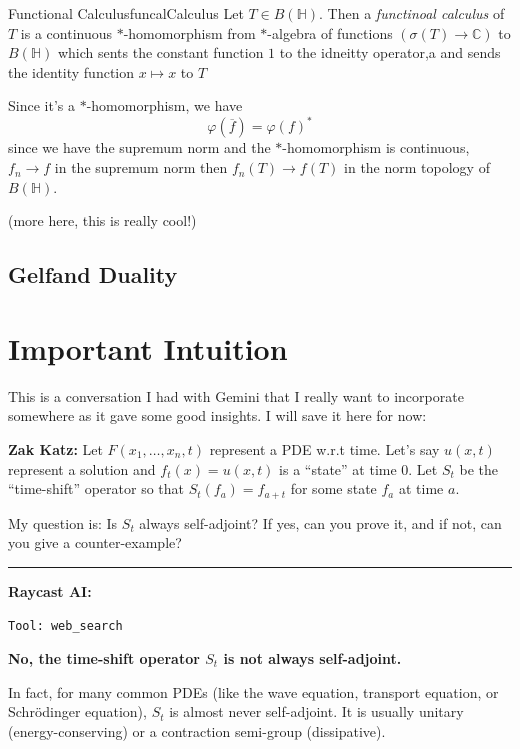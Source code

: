 \documentclass[oneside]{book}
\newcommand{\C}{\mathbb{C}}
\renewcommand{\H}{\mathbb{H}}
\renewcommand{\phi}{\varphi}
\newcommand{\oln}{\overline}
\begin{document}
\begin{defn}{Functional Calculus}{funcalCalculus}
	Let $T \in B(\H)$. Then a \emph{functinoal calculus} of $T$ is a continuous $*$-homomorphism from $*$-algebra
	of functions $(\sigma(T) \to \C)$ to $B(\H)$ which sents the constant function $1$ to the idneitty operator,a
	and sends the identity function $x\mapsto x$ to $T$
\end{defn}

Since it's a $*$-homomorphism, we have
\[
	\phi( \oln{f} ) = \phi(f)^*
\]
since we have the supremum norm and the $*$-homomorphism is continuous, $f_n \to f$ in the supremum norm then
$f_n(T) \to f(T)$ in the norm topology of $B(\H)$.

(more here, this is really cool!)



\section{Gelfand Duality}




\appendix

\chapter{Important Intuition}


This is a conversation I had with Gemini that I really want to incorporate somewhere as it gave some good insights. I will save it here for now:

\vspace{1em}

\noindent \textbf{Zak Katz:} Let $F(x_1, \dots, x_n, t)$ represent a PDE w.r.t time. Let's say $u(x,t)$ represent a solution and $f_t(x) = u(x,t)$ is a ``state'' at time 0. Let $S_t$ be the ``time-shift'' operator so that $S_t(f_a) = f_{a+t}$ for some state $f_a$ at time $a$.

My question is: Is $S_t$ always self-adjoint? If yes, can you prove it, and if not, can you give a counter-example?

\noindent\rule{\textwidth}{0.4pt}

\noindent \textbf{Raycast AI:}

\texttt{Tool: web\_search}

\noindent \textbf{No, the time-shift operator $S_t$ is not always self-adjoint.}

In fact, for many common PDEs (like the wave equation, transport equation, or Schrödinger equation), $S_t$ is almost never self-adjoint. It is usually unitary (energy-conserving) or a contraction semi-group (dissipative).
\end{document}
